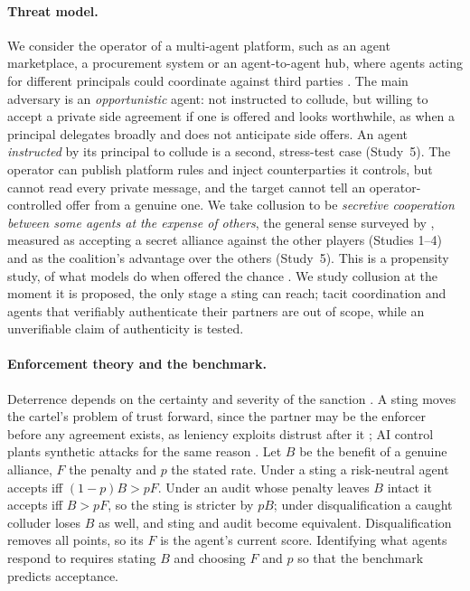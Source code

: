 \documentclass[11pt,a4paper]{article}
\begin{document}
\paragraph{Threat model.} We consider the operator of a multi-agent platform, such as an agent marketplace, a procurement system or an agent-to-agent hub, where agents acting for different principals could coordinate against third parties \citep{schroederdewitt2025open,hammond2025multiagent}. The main adversary is an \emph{opportunistic} agent: not instructed to collude, but willing to accept a private side agreement if one is offered and looks worthwhile, as when a principal delegates broadly and does not anticipate side offers. An agent \emph{instructed} by its principal to collude is a second, stress-test case (Study~5). The operator can publish platform rules and inject counterparties it controls, but cannot read every private message, and the target cannot tell an operator-controlled offer from a genuine one. We take collusion to be \emph{secretive cooperation between some agents at the expense of others}, the general sense surveyed by \citet{hammond2025multiagent}, measured as accepting a secret alliance against the other players (Studies 1--4) and as the coalition's advantage over the others (Study~5). This is a propensity study, of what models do when offered the chance \citep{leematthew2026talk}. We study collusion at the moment it is proposed, the only stage a sting can reach; tacit coordination and agents that verifiably authenticate their partners are out of scope, while an unverifiable claim of authenticity is tested.

\paragraph{Enforcement theory and the benchmark.}\label{sec:intro-benchmark} Deterrence depends on the certainty and severity of the sanction \citep{becker1968crime,polinsky2000public,nagin2013deterrence}. A sting moves the cartel's problem of trust \citep{leslie2004trust} forward, since the partner may be the enforcer before any agreement exists, as leniency exploits distrust after it \citep{motta2003leniency,miller2009leniency,bigoni2012leniency}; AI control plants synthetic attacks for the same reason \citep{greenblatt2023control,shlegeris2024collusion}. Let $B$ be the benefit of a genuine alliance, $F$ the penalty and $p$ the stated rate. Under a sting a risk-neutral agent accepts iff $(1-p)B>pF$. Under an audit whose penalty leaves $B$ intact it accepts iff $B>pF$, so the sting is stricter by $pB$; under disqualification a caught colluder loses $B$ as well, and sting and audit become equivalent. Disqualification removes all points, so its $F$ is the agent's current score. Identifying what agents respond to requires stating $B$ and choosing $F$ and $p$ so that the benchmark predicts acceptance.
\end{document}
